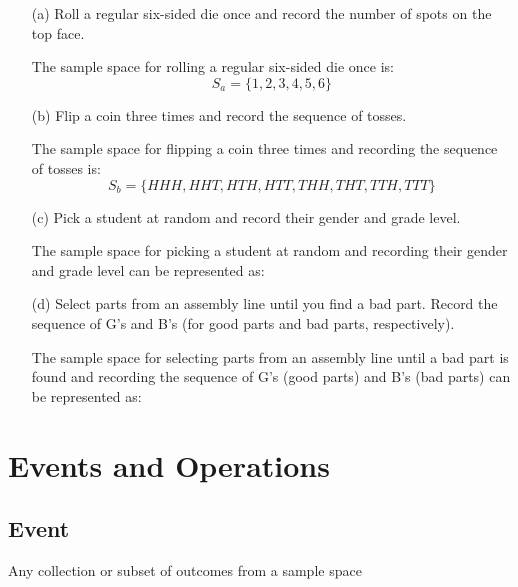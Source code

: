 \documentclass{report}
\begin{document}
\begin{enumerate}
    \item[(a)] Roll a regular six-sided die once and record the number of spots on the top face.
    
    \begin{solution}
    The sample space for rolling a regular six-sided die once is:
    \[ S_a = \{1, 2, 3, 4, 5, 6\} \]
    \end{solution}
    
    \item[(b)] Flip a coin three times and record the sequence of tosses.
    
    \begin{solution}
    The sample space for flipping a coin three times and recording the sequence of tosses is:
    \[ S_b = \{HHH, HHT, HTH, HTT, THH, THT, TTH, TTT\} \]
    \end{solution}
    
    \item[(c)] Pick a student at random and record their gender and grade level.
    
    \begin{solution}
    The sample space for picking a student at random and recording their gender and grade level can be represented as:
    \end{solution}
    
    \item[(d)] Select parts from an assembly line until you find a bad part. Record the sequence of G's and B's (for good parts and bad parts, respectively).
    
    \begin{solution}
    The sample space for selecting parts from an assembly line until a bad part is found and recording the sequence of G's (good parts) and B's (bad parts) can be represented as:
    \end{solution}
    
\end{enumerate}
\pagebreak
\section*{Events and Operations}
\bigbreak \noindent
\begin{mdframed}
\subsection*{Event}
Any collection or subset of outcomes from a sample space
\bigbreak \noindent
\end{mdframed}
\bigbreak \noindent
\end{document}
